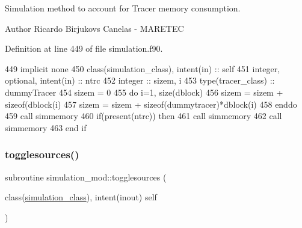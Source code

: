 Simulation method to account for Tracer memory consumption. 

\begin{DoxyAuthor}{Author}
Ricardo Birjukovs Canelas -\/ M\+A\+R\+E\+T\+EC 
\end{DoxyAuthor}


Definition at line 449 of file simulation.\+f90.


\begin{DoxyCode}
449     \textcolor{keywordtype}{implicit none}
450     \textcolor{keywordtype}{class}(simulation\_class), \textcolor{keywordtype}{intent(in)} :: self
451     \textcolor{keywordtype}{integer}, \textcolor{keywordtype}{optional}, \textcolor{keywordtype}{intent(in)} :: ntrc
452     \textcolor{keywordtype}{integer} :: sizem, i
453     \textcolor{keywordtype}{type}(tracer\_class) :: dummyTracer
454     sizem = 0
455     \textcolor{keywordflow}{do} i=1, \textcolor{keyword}{size}(dblock)
456         sizem = sizem + sizeof(dblock(i)%
457         sizem = sizem + sizeof(dummytracer)*dblock(i)%
458 \textcolor{keywordflow}{    enddo}
459     \textcolor{keyword}{call }simmemory%
460     \textcolor{keywordflow}{if}(\textcolor{keyword}{present}(ntrc)) \textcolor{keywordflow}{then}
461         \textcolor{keyword}{call }simmemory%
462         \textcolor{keyword}{call }simmemory%
463 \textcolor{keywordflow}{    end if}
\end{DoxyCode}
\mbox{\label{namespacesimulation__mod_a87a5141e4516b9610a6e4f0d2ff2d719}} 
\subsubsection{\texorpdfstring{togglesources()}{togglesources()}}
{\footnotesize\ttfamily subroutine simulation\+\_\+mod\+::togglesources (\begin{DoxyParamCaption}\item[{class(\mbox{\hyperlink{structsimulation__mod_1_1simulation__class}{simulation\+\_\+class}}), intent(inout)}]{self }\end{DoxyParamCaption})\hspace{0.3cm}{\ttfamily [private]}}



